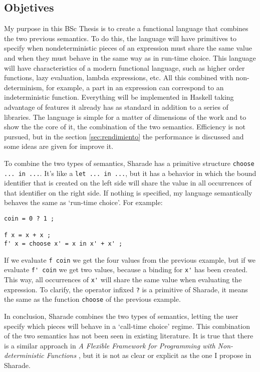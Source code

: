 \documentclass[class=article, crop=false]{standalone}
\begin{document}
\subsection{Objetives}
My purpose in this BSc Thesis is to create a functional language that combines the
two previous semantics. To do this, the language will have primitives to specify when
nondeterministic pieces of an expression must share the same value and when they must
behave in the same way as in run-time choice. This language will have characteristics of a
modern functional language, such as higher order functions, lazy evaluation, lambda
expressions, etc. All this combined with non-determinism, for example, a part in an
expression can correspond to an indeterministic function. Everything will be implemented in
Haskell taking advantage of features it already has as standard in addition to a series of
libraries. The language is simple for a matter of dimensions of the work and to show the the
core of it, the combination of the two semantics. Efficiency is not pursued, but in the
section \ref{sec:rendimiento} the performance is discussed and some ideas are given for
improve it.

To combine the two types of semantics, Sharade has a primitive structure
\verb`choose ... in ...`. It's like a \verb`let ... in ...`, but it has a behavior in which
the bound identifier that is created on the left side will share the value in all occurrences
of that identifier on the right side. If nothing is specified, my language semantically
behaves the same as `run-time choice'. For example:

\begin{verbatim}
coin = 0 ? 1 ;

f x = x + x ;
f' x = choose x' = x in x' + x' ;
\end{verbatim}

If we evaluate \verb`f coin` we get the four values from the previous example, but if we
evaluate \verb`f' coin` we get two values, because a binding for \verb`x'` has been created.
This way, all occurrences of \verb`x'` will share the same value when evaluating the
expression. To clarify, the operator infixed \verb`?` is a primitive of Sharade, it means the
same as the function \verb`choose` of the previous example.

In conclusion, Sharade combines the two types of semantics, letting the user specify which
pieces will behave in a `call-time choice' regime. This combination of the two semantics
has not been seen in existing literature. It is true that there is a similar approach in
\textit{A Flexible Framework for Programming with Non-deterministic Functions}
\cite{lopez2009flexible}, but it is not as clear or explicit as the one I
propose in Sharade.
\end{document}
